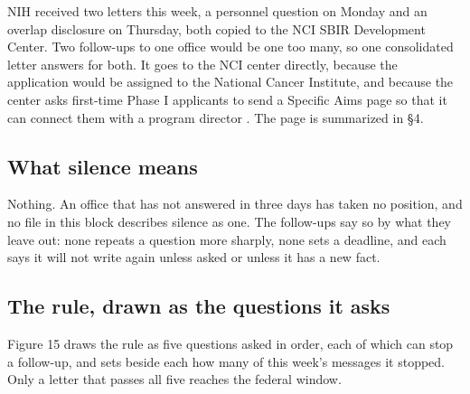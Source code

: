 NIH received two letters this week, a personnel question on Monday and an overlap
disclosure on Thursday, both copied to the NCI SBIR Development Center. Two
follow-ups to one office would be one too many, so one consolidated letter
answers for both. It goes to the NCI center directly, because the application
would be assigned to the National Cancer Institute, and because the center asks
first-time Phase I applicants to send a Specific Aims page so that it can connect
them with a program director \cite{ncisbir2026,ncisbirpd2026}. The page is
summarized in \S4.

\subsection{What silence means}

Nothing. An office that has not answered in three days has taken no position,
and no file in this block describes silence as one. The follow-ups say so by
what they leave out: none repeats a question more sharply, none sets a deadline,
and each says it will not write again unless asked or unless it has a new fact.

\subsection{The rule, drawn as the questions it asks}

Figure 15 draws the rule as five questions asked in order, each of which can stop
a follow-up, and sets beside each how many of this week's messages it stopped.
Only a letter that passes all five reaches the federal window.

